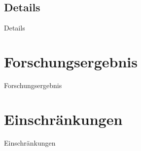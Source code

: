 \documentclass[]{beamer}
\begin{document}
\subsection*{Details}
\begin{frame}{Details}
	
\end{frame}

\section*{Forschungsergebnis}
\begin{frame}{Forschungsergebnis}
	
\end{frame}

\section*{Einschränkungen}
\begin{frame}{Einschränkungen}
	
\end{frame}
\end{document}
